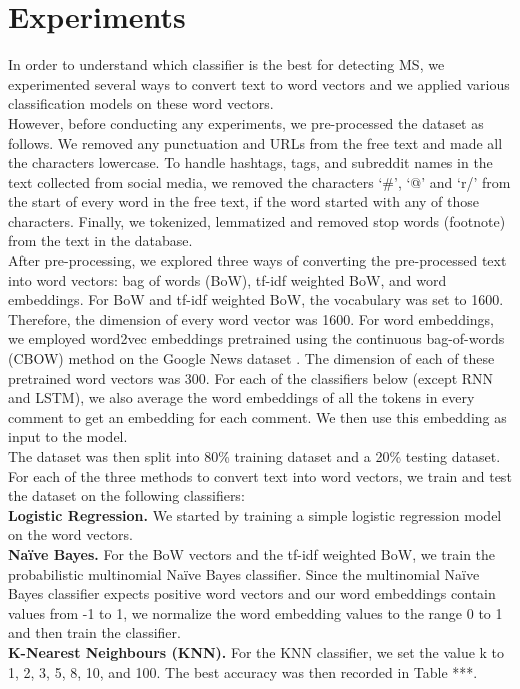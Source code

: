 \documentclass[11pt,a4paper]{article}
\begin{document}
\section{Experiments}
In order to understand which classifier is the best for detecting MS, we experimented several ways to convert text to word vectors and we applied various classification models on these word vectors. \\
\indent However, before conducting any experiments, we pre-processed the dataset as follows. We removed any punctuation and URLs from the free text and made all the characters lowercase. To handle hashtags, tags, and subreddit names in the text collected from social media, we removed the characters ‘\#’, ‘@’ and ‘r/’ from the start of every word in the free text, if the word started with any of those characters. Finally, we tokenized, lemmatized and removed stop words (footnote) from the text in the database. \\
\indent After pre-processing, we explored three ways of converting the pre-processed text into word vectors: bag of words (BoW), tf-idf weighted BoW, and word embeddings. For BoW and tf-idf weighted BoW, the vocabulary was set to 1600. Therefore, the dimension of every word vector was 1600. For word embeddings, we employed word2vec embeddings pretrained using the continuous bag-of-words (CBOW) method on the Google News dataset \citep{Mikolav:13}. The dimension of each of these pretrained word vectors was 300. For each of the classifiers below (except RNN and LSTM), we also average the word embeddings of all the tokens in every comment to get an embedding for each comment. We then use this embedding as input to the model. \\
\indent The dataset was then split into 80\% training dataset and a 20\% testing dataset. For each of the three methods to convert text into word vectors, we train and test the dataset on the following classifiers: \\
\indent \textbf{Logistic Regression.} We started by training a simple logistic regression model on the word vectors. \\
\indent \textbf{Naïve Bayes.} For the BoW vectors and the tf-idf weighted BoW, we train the probabilistic multinomial Naïve Bayes classifier. Since the multinomial Naïve Bayes classifier expects positive word vectors and our word embeddings contain values from -1 to 1, we normalize the word embedding values to the range 0 to 1 and then train the classifier. \\
\indent \textbf{K-Nearest Neighbours (KNN).} For the KNN classifier, we set the value k to 1, 2, 3, 5, 8, 10, and 100. The best accuracy was then recorded in Table ***. \\
\end{document}
